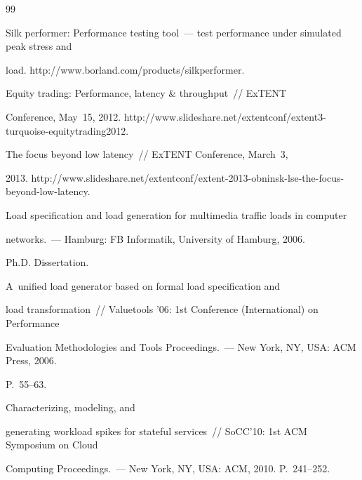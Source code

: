 {{\begin{thebibliography}{99}


  Silk performer: Performance testing tool~--- test performance under simulated peak stress and


load. {\sf http://www.borland.com/products/silkperformer}.







   Equity trading: Performance, latency \& throughput~/\!\!/ ExTENT


Conference, May~15, 2012. {\sf http://www.slideshare.net/extentconf/extent3-turquoise-equitytrading2012}.







   The focus beyond low latency~/\!\!/ ExTENT Conference, March~3,


2013. {\sf http://www.slideshare.net/extentconf/extent-2013-obninsk-lse-the-focus-beyond-low-latency}.







   Load specification and load generation for multimedia traffic loads in computer


networks.~--- Hamburg: FB Informatik, University of Hamburg, 2006.


 Ph.D. Dissertation.







   A~unified load generator based on formal load specification and


load transformation~/\!\!/ Valuetools '06:  1st Conference (International) on Performance


Evaluation Methodologies and Tools Proceedings.~--- New York, NY, USA: ACM Press, 2006.


P.~55--63.







   Characterizing, modeling, and


generating workload spikes for stateful services~/\!\!/ SoCC'10: 1st ACM Symposium on Cloud


Computing Proceedings.~--- New York, NY, USA: ACM, 2010. P.~241--252.






\end{thebibliography}}}
